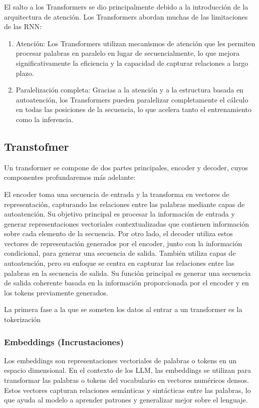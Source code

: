 El salto a los Transformers se dio principalmente debido a la introducción de la arquitectura de atención. Los Transformers abordan muchas de las limitaciones de las RNN:
\begin{enumerate}

\item Atención: Los Transformers utilizan mecanismos de atención que les permiten procesar palabras en paralelo en lugar de secuencialmente, lo que mejora significativamente la eficiencia y la capacidad de capturar relaciones a largo plazo.
\item Paralelización completa: Gracias a la atención y a la estructura basada en autoatención, los Transformers pueden paralelizar completamente el cálculo en todas las posiciones de la secuencia, lo que acelera tanto el entrenamiento como la inferencia.
\end{enumerate}








\subsection{Transtofmer}
Un transformer se compone de dos partes principales, encoder y decoder, cuyos componentes profundaremos más adelante:

 El encoder toma una secuencia de entrada y la transforma en vectores de representación, capturando las relaciones entre las palabras mediante capas de autoatención. Su objetivo principal es procesar la información de entrada y generar representaciones vectoriales contextualizadas que contienen información sobre cada elemento de la secuencia. Por otro lado, el decoder utiliza estos vectores de representación generados por el encoder, junto con la información condicional, para generar una secuencia de salida. También utiliza capas de autoatención, pero su enfoque se centra en capturar las relaciones entre las palabras en la secuencia de salida. Su función principal es generar una secuencia de salida coherente basada en la información proporcionada por el encoder y en los tokens previamente generados.

 La primera fase a la que se someten los datos al entrar a un transformer es la tokerización

 \subsubsection{Embeddings (Incrustaciones)}
   Los embeddings son representaciones vectoriales de palabras o tokens en un espacio dimensional. En el contexto de los LLM, las embeddings se utilizan para transformar las palabras o tokens del vocabulario en vectores numéricos densos. Estos vectores capturan relaciones semánticas y sintácticas entre las palabras, lo que ayuda al modelo a aprender patrones y generalizar mejor sobre el lenguaje.

